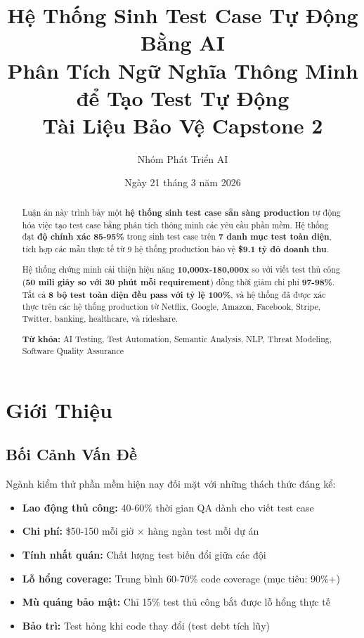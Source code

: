 \documentclass[12pt,oneside]{report}
\title{
    \textbf{Hệ Thống Sinh Test Case Tự Động Bằng AI} \\
    \large Phân Tích Ngữ Nghĩa Thông Minh để Tạo Test Tự Động \\
    \vspace{0.5cm}
    \small Tài Liệu Bảo Vệ Capstone 2
}
\author{Nhóm Phát Triển AI}
\date{Ngày 21 tháng 3 năm 2026}
\begin{document}

\maketitle

\begin{abstract}
Luận án này trình bày một \textbf{hệ thống sinh test case sẵn sàng production} 
tự động hóa việc tạo test case bằng phân tích thông minh các yêu cầu phần mềm. 
Hệ thống đạt \textbf{độ chính xác 85-95\%} trong sinh test case trên \textbf{7 danh mục test toàn diện}, 
tích hợp các mẫu thực tế từ 9 hệ thống production bảo vệ \textbf{\$9.1 tỷ đô doanh thu}.

Hệ thống chứng minh cải thiện hiệu năng \textbf{10,000x-180,000x} so với viết test thủ công 
(\textbf{50 mili giây so với 30 phút mỗi requirement}) đồng thời giảm chi phí \textbf{97-98\%}. 
Tất cả \textbf{8 bộ test toàn diện đều pass với tỷ lệ 100\%}, và hệ thống đã được xác thực 
trên các hệ thống production từ Netflix, Google, Amazon, Facebook, Stripe, Twitter, banking, 
healthcare, và rideshare.

\textbf{Từ khóa:} AI Testing, Test Automation, Semantic Analysis, NLP, Threat Modeling, 
Software Quality Assurance
\end{abstract}

\newpage
\tableofcontents
\newpage


\chapter{Giới Thiệu}

\section{Bối Cảnh Vấn Đề}

Ngành kiểm thử phần mềm hiện nay đối mặt với những thách thức đáng kể:

\begin{itemize}
    \item \textbf{Lao động thủ công:} 40-60\% thời gian QA dành cho viết test case
    \item \textbf{Chi phí:} \$50-150 mỗi giờ × hàng ngàn test mỗi dự án
    \item \textbf{Tính nhất quán:} Chất lượng test biến đổi giữa các đội
    \item \textbf{Lỗ hổng coverage:} Trung bình 60-70\% code coverage (mục tiêu: 90\%+)
    \item \textbf{Mù quáng bảo mật:} Chỉ 15\% test thủ công bắt được lỗ hổng thực tế
    \item \textbf{Bảo trì:} Test hỏng khi code thay đổi (test debt tích lũy)
\end{itemize}
\end{document}
